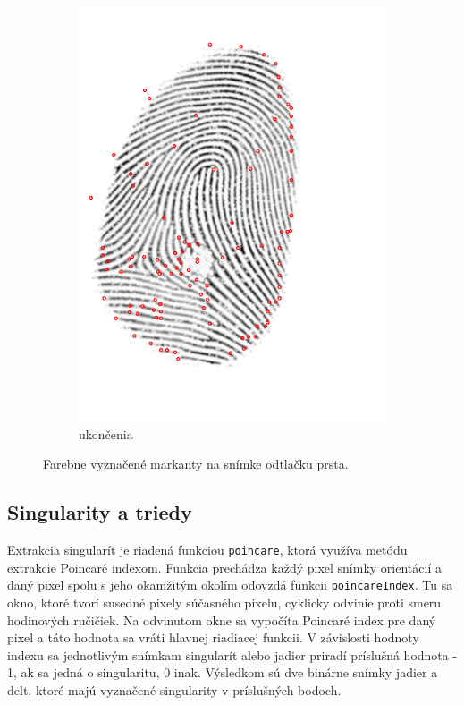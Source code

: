 \begin{figure}[h]
\begin{subfigure}[b]{0.3\linewidth}
      \includegraphics[width=\linewidth]{obrazky-figures/ridge_endings.png}
      \caption{ukončenia}
    \end{subfigure}
    \caption{Farebne vyznačené markanty na snímke odtlačku prsta.}
    \label{obr:markanty}
  \end{figure}

  \subsection{Singularity a triedy}
  Extrakcia singularít je riadená funkciou \texttt{poincare}, ktorá využíva metódu extrakcie Poincaré indexom. Funkcia prechádza každý pixel snímky orientácií
  a daný pixel spolu s jeho okamžitým okolím odovzdá funkcii \texttt{poincareIndex}. Tu sa okno, ktoré tvorí susedné pixely súčasného pixelu, cyklicky odvinie
  proti smeru hodinových ručičiek. Na odvinutom okne sa vypočíta Poincaré index pre daný pixel a táto hodnota sa vráti hlavnej riadiacej funkcii.
  V závislosti hodnoty indexu sa jednotlivým snímkam singularít alebo jadier priradí príslušná hodnota - 1, ak sa jedná o singularitu, 0 inak.
  Výsledkom sú dve binárne snímky jadier a delt, ktoré majú vyznačené singularity v príslušných bodoch.
  

